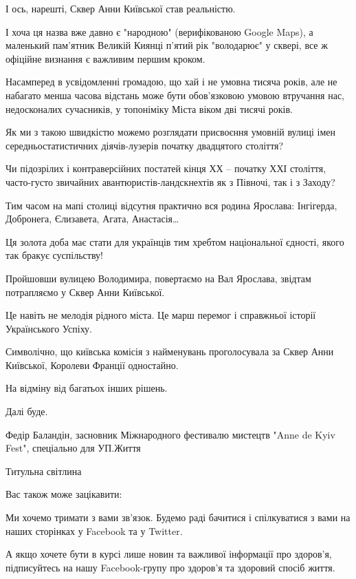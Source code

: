 І ось, нарешті, Сквер Анни Київської став реальністю.

І хоча ця назва вже давно є "народною" (верифікованою Google Maps), а маленький
пам’ятник Великій Киянці п’ятий рік "володарює" у сквері, все ж офіційне
визнання є важливим першим кроком.

Насамперед в усвідомленні громадою, що хай і не умовна тисяча років, але не
набагато менша часова відстань може бути обов’язковою умовою втручання нас,
недосконалих сучасників, у топоніміку Міста віком дві тисячі років.

Як ми з такою швидкістю можемо розглядати присвоєння умовній вулиці імен
середньостатистичних діячів-лузерів початку двадцятого століття?

Чи підозрілих і контраверсійних постатей кінця ХХ – початку ХХІ століття,
часто-густо звичайних авантюристів-ландскнехтів як з Півночі, так і з Заходу?

Тим часом на мапі столиці відсутня практично вся родина Ярослава: Інгігерда,
Добронега, Єлизавета, Агата, Анастасія… 

Ця золота доба має стати для українців тим хребтом національної єдності, якого
так бракує суспільству!

Пройшовши вулицею Володимира, повертаємо на Вал Ярослава, звідтам потрапляємо у
Сквер Анни Київської.

Це навіть не мелодія рідного міста. Це марш перемог і справжньої історії
Українського Успіху.

Символічно, що київська комісія з найменувань проголосувала за Сквер Анни
Київської, Королеви Франції одностайно.

На відміну від багатьох інших рішень.

Далі буде.

Федір Баландін, засновник Міжнародного фестивалю мистецтв "Anne de Kyiv Fest",
спеціально для УП.Життя

Титульна світлина 

Вас також може зацікавити: 

Ми хочемо тримати з вами зв'язок. Будемо раді бачитися і спілкуватися з вами на
наших сторінках у Facebook та у Twitter.

А якщо хочете бути в курсі лише новин та важливої інформації про здоров'я,
підписуйтесь на нашу Facebook-групу про здоров'я та здоровий спосіб життя.
  
